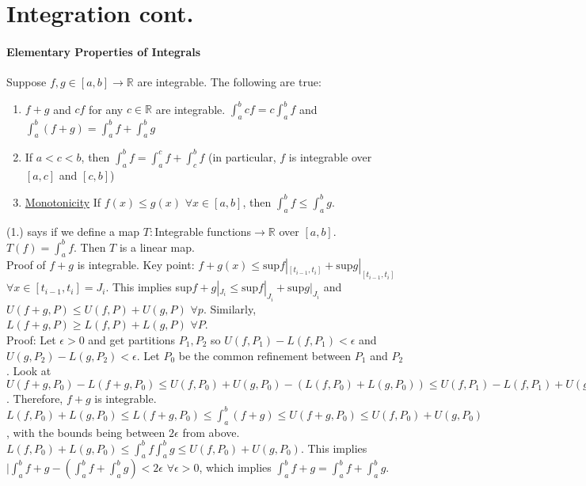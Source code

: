 \documentclass[10pt,letter]{article}
\begin{document}
\section*{Integration cont.}

\paragraph{Elementary Properties of Integrals}
Suppose $f,g\in[a,b]\rightarrow\mathbb{R}$ are integrable. The following are true: 
\begin{enumerate}
    \item $f+g$ and $cf$ for any $c\in\mathbb{R}$ are integrable. $\int_a^bcf=c\int_a^bf$ and $\int_a^b(f+g)=\int_a^bf+\int_a^bg$
    \item If $a<c<b$, then $\int_a^bf=\int_a^cf+\int_c^bf$ (in particular, $f$ is integrable over $[a,c]$ and $[c,b]$)
    \item \underline{Monotonicity} If $f(x)\leq g(x)$ $\forall x\in[a,b]$, then $\int_a^bf\leq\int_a^bg$.
\end{enumerate}
(1.) says if we define a map $T:$Integrable functions$\rightarrow\mathbb{R}$ over $[a,b]$. $T(f)=\int_a^bf$. Then $T$ is a linear map. \\ 

Proof of $f+g$ is integrable. Key point: $f+g(x)\leq \text{sup}f|_{[t_{i-1},t_i]}+\text{sup}g|_{[t_{i-1},t_i]}$ $\forall x\in[t_{i-1},t_i]=J_i$. This implies sup$f+g|_{J_i}\leq \text{sup}f|_{J_i}+\text{sup}g|_{J_i}$ and $U(f+g,P)\leq U(f,P) + U(g,P)$ $\forall p$. Similarly, $L(f+g,P)\geq L(f,P)+L(g,P)$ $\forall P$. \\ 
Proof: Let $\epsilon>0$ and get partitions $P_1,P_2$ so $U(f,P_1)-L(f,P_1)<\epsilon$ and $U(g,P_2)-L(g,P_2)<\epsilon$. Let $P_0$ be the common refinement between $P_1$ and $P_2$. Look at $U(f+g,P_0)-L(f+g,P_0)\leq U(f,P_0)+U(g,P_0)-(L(f,P_0)+L(g,P_0))\leq U(f,P_1)-L(f,P_1)+U(g,P_2)-L(g,P_2)< 2\epsilon$. Therefore, $f+g$ is integrable. 
$L(f,P_0)+L(g,P_0)\leq L(f+g,P_0)\leq \int_a^b(f+g)\leq U(f+g,P_0)\leq U(f,P_0)+U(g,P_0)$, with the bounds being between $2\epsilon$ from above. $L(f,P_0)+L(g,P_0)\leq \int_a^bf \int_a^bg\leq U(f,P_0)+U(g,P_0)$. This implies $|\int_a^bf+g - (\int_a^bf+\int_a^bg)<2\epsilon$ $\forall\epsilon>0$, which implies $\int_a^bf+g=\int_a^bf+\int_a^bg$. \\ \\ 
\end{document}
